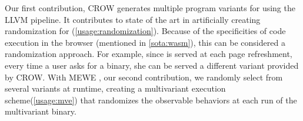 Our first contribution, CROW \cite{CROW} generates multiple program variants for \wasm using the LLVM pipeline.
It contributes to state of the art in artificially creating randomization for \wasm (\autoref{usage:randomization}). Because of the specificities of code execution in the browser (mentioned in \autoref{sota:wasm}), this can be considered a randomization approach. For example, since \wasm is served at each page refreshment, every time a user asks for a \wasm binary, she can be served a different variant provided by CROW. 
With MEWE \cite{MEWE}, our second contribution, we randomly select from several variants at runtime, creating a multivariant execution scheme(\autoref{usage:mve}) that randomizes the observable behaviors at each run of the multivariant binary. %

